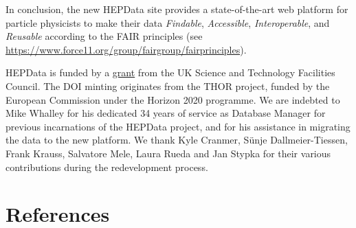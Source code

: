 \documentclass[a4paper]{jpconf}
\begin{document}
In conclusion, the new HEPData site provides a state-of-the-art web platform
for particle physicists to make their data \emph{Findable}, \emph{Accessible},
\emph{Interoperable}, and \emph{Reusable} according to the FAIR principles (see
\url{https://www.force11.org/group/fairgroup/fairprinciples}).

\ack
HEPData is funded by a
\href{http://gtr.rcuk.ac.uk/projects?ref=ST/N000315/1}{grant} from the UK
Science and Technology Facilities Council.  The DOI minting originates from the
THOR project, funded by the European Commission under the Horizon 2020
programme.  We are indebted to Mike Whalley for his dedicated 34 years of
service as Database Manager for previous incarnations of the HEPData project,
and for his assistance in migrating the data to the new platform.  We thank
Kyle Cranmer, S\"unje Dallmeier-Tiessen, Frank Krauss, Salvatore Mele, Laura
Rueda and Jan Stypka for their various contributions during the redevelopment
process.

\section*{References}


\end{document}
